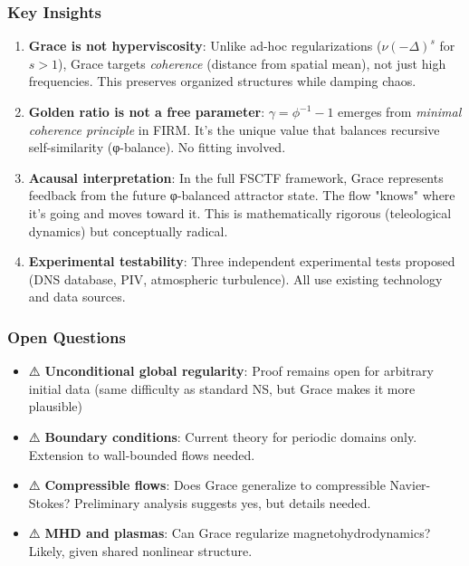 \documentclass[12pt,a4paper]{article}
\begin{document}
\subsubsection{Key Insights}

\begin{enumerate}
\item \textbf{Grace is not hyperviscosity}: Unlike ad-hoc regularizations ($\nu(-\Delta)^s$ for $s>1$), Grace targets \emph{coherence} (distance from spatial mean), not just high frequencies. This preserves organized structures while damping chaos.

\item \textbf{Golden ratio is not a free parameter}: $\gamma = \phi^{-1} - 1$ emerges from \emph{minimal coherence principle} in FIRM. It's the unique value that balances recursive self-similarity (φ-balance). No fitting involved.

\item \textbf{Acausal interpretation}: In the full FSCTF framework, Grace represents feedback from the future φ-balanced attractor state. The flow "knows" where it's going and moves toward it. This is mathematically rigorous (teleological dynamics) but conceptually radical.

\item \textbf{Experimental testability}: Three independent experimental tests proposed (DNS database, PIV, atmospheric turbulence). All use existing technology and data sources.
\end{enumerate}

\subsubsection{Open Questions}

\begin{itemize}
\item ⚠️ \textbf{Unconditional global regularity}: Proof remains open for arbitrary initial data (same difficulty as standard NS, but Grace makes it more plausible)
\item ⚠️ \textbf{Boundary conditions}: Current theory for periodic domains only. Extension to wall-bounded flows needed.
\item ⚠️ \textbf{Compressible flows}: Does Grace generalize to compressible Navier-Stokes? Preliminary analysis suggests yes, but details needed.
\item ⚠️ \textbf{MHD and plasmas}: Can Grace regularize magnetohydrodynamics? Likely, given shared nonlinear structure.
\end{itemize}
\end{document}
